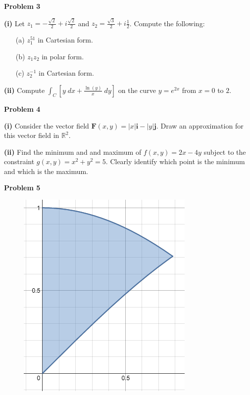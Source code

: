 \documentclass[12pt]{amsbook}
\newcommand{\DD}{\displaystyle}
\begin{document}
\newpage

\textbf{Problem 3}

\vspace{.25cm}

\textbf{(i)} Let $z_1 = -\frac{\sqrt{2}}{2} + i\frac{\sqrt{2}}{2}$ and $z_2 = \frac{\sqrt{3}}{2}+i\frac{1}{2}$. Compute the following:
\begin{itemize}
\item[(a)] $z_1^{51}$ in Cartesian form.
\item[(b)] $z_1 z_2$ in polar form.
\item[(c)] $z_2^{-1}$ in Cartesian form.
\end{itemize}


\vspace{7cm}

\textbf{(ii)} Compute $\DD \int_C \left[y \; dx + \frac{\ln(y)}{x} \; dy\right]$ on the curve $y=e^{2x}$ from $x=0$ to $2$.




\newpage

\textbf{Problem 4}

\vspace{.25cm}

\textbf{(i)} Consider the vector field $\textbf{F}(x,y) = |x|\textbf{i} - |y|\textbf{j}$. Draw an approximation for this vector field in $\mathbb{R}^2$.


\vspace{8cm}

\textbf{(ii)} Find the minimum and and maximum of $f(x,y) = 2x-4y$ subject to the constraint $g(x,y) = x^2+y^2 = 5$. Clearly identify which point is the minimum and which is the maximum.









\newpage

\textbf{Problem 5}

\vspace{.25cm}

\begin{figure} 
    \centering
    \includegraphics[scale=.5]{region.png}
\end{figure}
\end{document}
